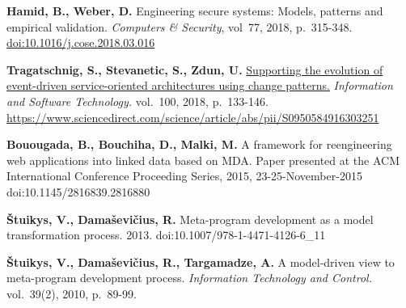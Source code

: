 \documentclass[runningheads]{llncs}
\begin{document}
\begin{thebibliography}{11}
\textbf{Hamid, B., Weber, D.} Engineering secure systems: Models, patterns
and empirical validation. \emph{Computers \& Security},  vol~77, 2018, p.~315-348.
\href{https://www.sciencedirect.com/science/article/pii/S0167404818303043}{doi:10.1016/j.cose.2018.03.016}


\textbf{Tragatschnig, S., Stevanetic, S., Zdun, U.} \href{https://www.sciencedirect.com/science/article/abs/pii/S0950584916303251}{Supporting the
evolution of event-driven service-oriented architectures using change
patterns.} \emph{Information and Software Technology.} vol.~100, 2018, p.~133-146. \href{doi:10.1016/j.infsof.2018.04.005}{https://www.sciencedirect.com/science/article/abs/pii/S0950584916303251}



\textbf{Bouougada, B., Bouchiha, D., Malki, M.} A framework for
reengineering web applications into linked data based on MDA. Paper
presented at the ACM International Conference Proceeding Series, 2015,
23-25-November-2015 doi:10.1145/2816839.2816880


\textbf{Štuikys, V., Damaševičius, R.} Meta-program development as a
model transformation process. 2013. doi:10.1007/978-1-4471-4126-6\_11

\bibitem{}
\textbf{Štuikys, V., Damaševičius, R., Targamadze, A.} A model-driven
view to meta-program development process. \emph{Information Technology and
Control.} vol.~39(2), 2010, p.~89-99.


\end{thebibliography}




\end{document}
